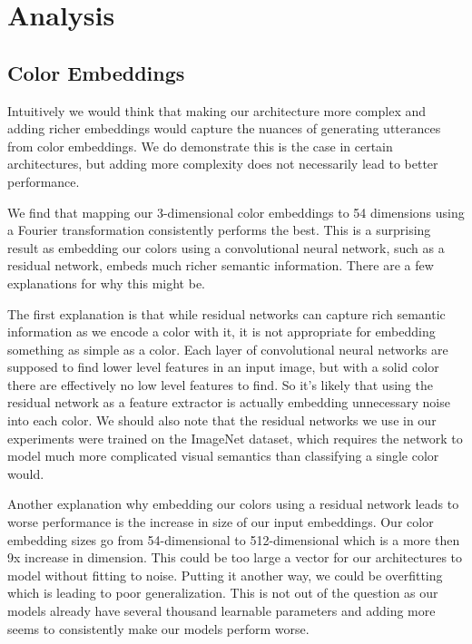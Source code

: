 \section{Analysis}

\subsection{Color Embeddings}

Intuitively we would think that making our architecture more complex and adding richer embeddings would capture the nuances of generating utterances from color embeddings. We do demonstrate this is the case in certain architectures, but adding more complexity does not necessarily lead to better performance.

\par
We find that mapping our 3-dimensional color embeddings to 54 dimensions using a Fourier transformation consistently performs the best. This is a surprising result as embedding our colors using a convolutional neural network, such as a residual network, embeds much richer semantic information. There are a few explanations for why this might be.

\par
The first explanation is that while residual networks can capture rich semantic information as we encode a color with it, it is not appropriate for embedding something as simple as a color. Each layer of convolutional neural networks are supposed to find lower level features in an input image, but with a solid color there are effectively no low level features to find. So it’s likely that using the residual network as a feature extractor is actually embedding unnecessary noise into each color. We should also note that the residual networks we use in our experiments were trained on the ImageNet dataset, which requires the network to model much more complicated visual semantics than classifying a single color would.

\par
Another explanation why embedding our colors using a residual network leads to worse performance is the increase in size of our input embeddings. Our color embedding sizes go from 54-dimensional to 512-dimensional which is a more then 9x increase in dimension. This could be too large a vector for our architectures to model without fitting to noise. Putting it another way, we could be overfitting which is leading to poor generalization. This is not out of the question as our models already have several thousand learnable parameters and adding more seems to consistently make our models perform worse.

